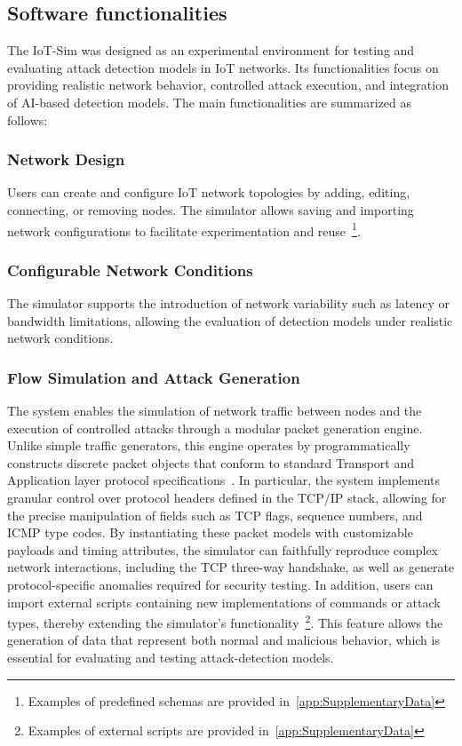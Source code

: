 \subsection{Software functionalities}
\label{subsec:SoftwareFunctionalities}
The IoT-Sim was designed as an experimental environment for testing and evaluating attack detection models in IoT networks. Its functionalities focus on providing realistic network behavior, controlled attack execution, and integration of AI-based detection models. The main functionalities are summarized as follows:

\subsubsection{Network Design}
\label{subsubsec:NetworkDesign}
Users can create and configure IoT network topologies by adding, editing, connecting, or removing nodes. The simulator allows saving and importing network configurations to facilitate experimentation and reuse~\footnote{Examples of predefined schemas are provided in~\ref{app:SupplementaryData}}.

\subsubsection{Configurable Network Conditions}
\label{subsubsec:ConfigurableNetworkConditions}
The simulator supports the introduction of network variability such as latency or bandwidth limitations, allowing the evaluation of detection models under realistic network conditions.

\subsubsection{Flow Simulation and Attack Generation}
\label{subsubsec:FlowSimulationAttackGeneration}
The system enables the simulation of network traffic between nodes and the execution of controlled attacks through a modular packet generation engine. Unlike simple traffic generators, this engine operates by programmatically constructs discrete packet objects that conform to standard Transport and Application layer protocol specifications~\cite{protocols}. In particular, the system implements granular control over protocol headers defined in the TCP/IP stack, allowing for the precise manipulation of fields such as TCP flags, sequence numbers, and ICMP type codes. By instantiating these packet models with customizable payloads and timing attributes, the simulator can faithfully reproduce complex network interactions, including the TCP three-way handshake, as well as generate protocol-specific anomalies required for security testing. In addition, users can import external scripts containing new implementations of commands or attack types, thereby extending the simulator’s functionality~\footnote{Examples of external scripts are provided in~\ref{app:SupplementaryData}}. This feature allows the generation of data that represent both normal and malicious behavior, which is essential for evaluating and testing attack-detection models.

